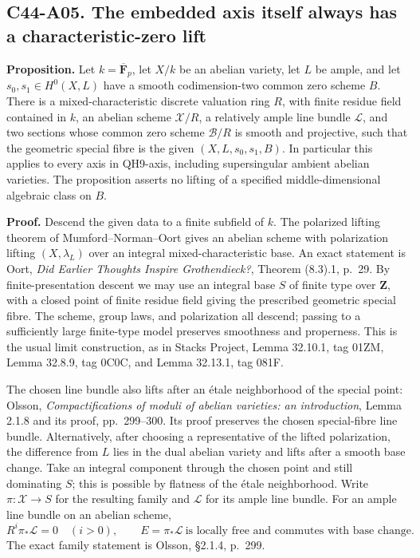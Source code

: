 \documentclass[11pt]{article}
\theoremstyle{remark}\newtheorem{remark}[theorem]{Remark}
\begin{document}
\subsection*{C44-A05. The embedded axis itself always has a characteristic-zero lift}

\textbf{Proposition.}
Let $k=\overline{\mathbf F}_p$, let $X/k$ be an abelian variety,
let $L$ be ample, and let $s_0,s_1\in H^0(X,L)$ have a smooth
codimension-two common zero scheme $B$. There is a mixed-characteristic
discrete valuation ring $R$, with finite residue field contained in $k$,
an abelian scheme $\mathcal X/R$, a relatively ample line bundle
$\mathcal L$, and two sections whose common zero scheme
$\mathcal B/R$ is smooth and projective, such that the geometric
special fibre is the given $(X,L,s_0,s_1,B)$. In particular this
applies to every axis in QH9-axis, including supersingular ambient
abelian varieties. The proposition asserts no lifting of a specified
middle-dimensional algebraic class on $B$.

\textbf{Proof.}
Descend the given data to a finite subfield of $k$. The polarized
lifting theorem of Mumford--Norman--Oort gives an abelian scheme
with polarization lifting $(X,\lambda_L)$ over an integral
mixed-characteristic base. An exact statement is Oort,
\emph{Did Earlier Thoughts Inspire Grothendieck?}, Theorem (8.3).1,
p.~29. By finite-presentation descent we may use an integral base
$S$ of finite type over $\mathbf Z$, with a closed point of finite
residue field giving the prescribed geometric special fibre. The
scheme, group laws, and polarization all descend; passing to a
sufficiently large finite-type model preserves smoothness and
properness. This is the usual limit construction, as in Stacks
Project, Lemma 32.10.1, tag 01ZM, Lemma 32.8.9, tag 0C0C,
and Lemma 32.13.1, tag 081F.

The chosen line bundle also lifts after an \'etale neighborhood of
the special point: Olsson, \emph{Compactifications of moduli of
abelian varieties: an introduction}, Lemma 2.1.8 and its proof,
pp.~299--300. Its proof preserves the chosen special-fibre line
bundle. Alternatively, after choosing a representative of the
lifted polarization, the difference from $L$ lies in the dual
abelian variety and lifts after a smooth base change. Take an
integral component through the chosen point and still dominating
$S$; this is possible by flatness of the \'etale neighborhood.
Write $\pi:\mathcal X\to S$ for the resulting family and
$\mathcal L$ for its ample line bundle. For an ample line bundle
on an abelian scheme,
\[
 R^i\pi_*\mathcal L=0\quad(i>0),\qquad
 E=\pi_*\mathcal L\ \text{is locally free and commutes with base change}.
\]
The exact family statement is Olsson, \S2.1.4, p.~299.
\end{document}
